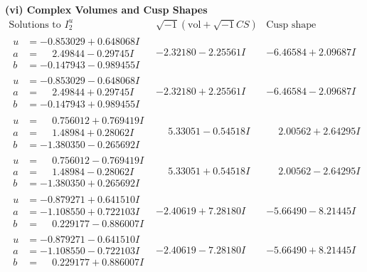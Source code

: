 \documentclass[1p]{elsarticle_modified}
\theoremstyle{definition}
\newcommand{\I}{\sqrt{-1}}
\begin{document}
\newpage\flushleft \textbf{(vi) Complex Volumes and Cusp Shapes}
$$\begin{array}{c|c|c}  
\text{Solutions to }I^u_{2}& \I (\text{vol} + \sqrt{-1}CS) & \text{Cusp shape}\\
 \hline 
\begin{aligned}
u &= -0.853029 + 0.648068 I \\
a &= \phantom{-}2.49844 - 0.29745 I \\
b &= -0.147943 - 0.989455 I\end{aligned}
 & -2.32180 - 2.25561 I & -6.46584 + 2.09687 I \\ \hline\begin{aligned}
u &= -0.853029 - 0.648068 I \\
a &= \phantom{-}2.49844 + 0.29745 I \\
b &= -0.147943 + 0.989455 I\end{aligned}
 & -2.32180 + 2.25561 I & -6.46584 - 2.09687 I \\ \hline\begin{aligned}
u &= \phantom{-}0.756012 + 0.769419 I \\
a &= \phantom{-}1.48984 + 0.28062 I \\
b &= -1.380350 - 0.265692 I\end{aligned}
 & \phantom{-}5.33051 - 0.54518 I & \phantom{-}2.00562 + 2.64295 I \\ \hline\begin{aligned}
u &= \phantom{-}0.756012 - 0.769419 I \\
a &= \phantom{-}1.48984 - 0.28062 I \\
b &= -1.380350 + 0.265692 I\end{aligned}
 & \phantom{-}5.33051 + 0.54518 I & \phantom{-}2.00562 - 2.64295 I \\ \hline\begin{aligned}
u &= -0.879271 + 0.641510 I \\
a &= -1.108550 + 0.722103 I \\
b &= \phantom{-}0.229177 - 0.886007 I\end{aligned}
 & -2.40619 + 7.28180 I & -5.66490 - 8.21445 I \\ \hline\begin{aligned}
u &= -0.879271 - 0.641510 I \\
a &= -1.108550 - 0.722103 I \\
b &= \phantom{-}0.229177 + 0.886007 I\end{aligned}
 & -2.40619 - 7.28180 I & -5.66490 + 8.21445 I \\ \hline\begin{aligned}

\end{aligned}
\end{array}$$
\end{document}
